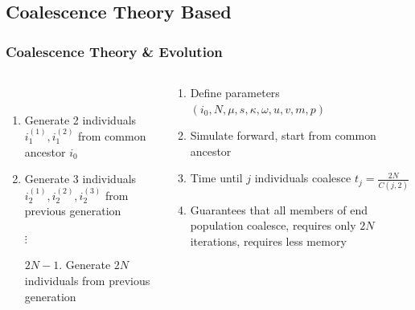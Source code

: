 \documentclass[11pt]{beamer}
\begin{document}
	\subsection{Coalescence Theory Based}\label{subsec:coalescenceTheoryBased}
	\begin{frame}
		\frametitle{Coalescence Theory \& Evolution}
		\begin{columns}
			\begin{column}{0.5\textwidth}
				\\ \medskip
				\tiny{
					\begin{enumerate}
						\item Generate 2 individuals $i_1^{(1)}, i_1^{(2)}$ from common ancestor $i_0$
						\item Generate 3 individuals $i_2^{(1)}, i_2^{(2)}, i_2^{(3)}$ from previous generation
						\item[$\vdots$]
						\item[$2N - 1$.] \medskip Generate $2N$ individuals from previous generation
					\end{enumerate}
				}
			\end{column}
			\begin{column}{0.5\textwidth}
				\begin{enumerate}
					\item Define parameters $(i_0, N, \mu, s, \kappa, \omega, u, v, m, p)$
					\item Simulate forward, start from common ancestor
					\item Time until $j$ individuals coalesce $t_j = \frac{2N}{C(j, 2)}$
					\item Guarantees that all members of end population coalesce, requires only $2N$ iterations,
					requires less memory
				\end{enumerate}
			\end{column}
		\end{columns}
	\end{frame}
\end{document}
